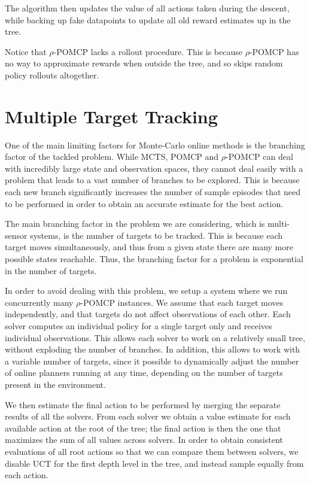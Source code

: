 The algorithm then updates the value of all actions taken during the descent, while backing up fake
datapoints to update all old reward estimates up in the tree.

Notice that $\rho$-POMCP lacks a rollout procedure. This is because $\rho$-POMCP has no way to
approximate rewards when outside the tree, and so skips random policy rollouts altogether.

\section{Multiple Target Tracking}

One of the main limiting factors for Monte-Carlo online methods is the branching factor of the
tackled problem. While MCTS, POMCP and $\rho$-POMCP can deal with incredibly large state and
observation spaces, they cannot deal easily with a problem that leads to a vast number of branches
to be explored. This is because each new branch significantly increases the number of sample
episodes that need to be performed in order to obtain an accurate estimate for the best action.

The main branching factor in the problem we are considering, which is multi-sensor systems, is the
number of targets to be tracked. This is because each target moves simultaneously, and thus from a
given state there are many more possible states reachable. Thus, the branching factor for a problem
is exponential in the number of targets.

In order to avoid dealing with this problem, we setup a system where we run concurrently many
$\rho$-POMCP instances. We assume that each target moves independently, and that targets do not
affect observations of each other. Each solver computes an individual policy for a single target
only and receives individual observations. This allows each solver to work on a relatively small
tree, without exploding the number of branches. In addition, this allows to work with a variable
number of targets, since it possible to dynamically adjust the number of online planners running at
any time, depending on the number of targets present in the environment.

We then estimate the final action to be performed by merging the separate results of all the
solvers. From each solver we obtain a value estimate for each available action at the root of the
tree; the final action is then the one that maximizes the sum of all values across solvers. In order
to obtain consistent evaluations of all root actions so that we can compare them between solvers, we
disable UCT for the first depth level in the tree, and instead sample equally from each action.

